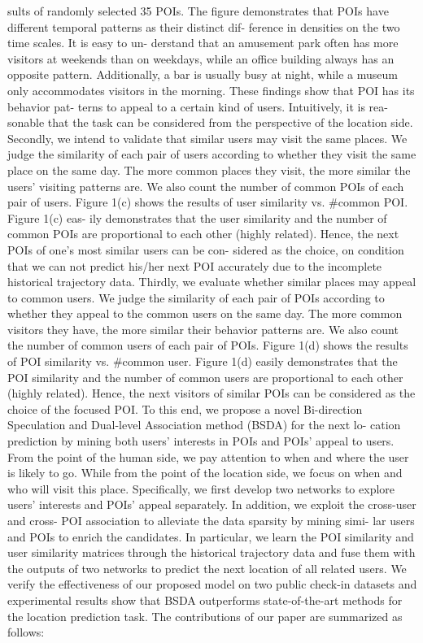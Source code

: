 \documentclass{article}
\begin{document}
sults of randomly selected 35 POIs. The figure demonstrates
that POIs have different temporal patterns as their distinct dif-
ference in densities on the two time scales. It is easy to un-
derstand that an amusement park often has more visitors at
weekends than on weekdays, while an office building always
has an opposite pattern. Additionally, a bar is usually busy
at night, while a museum only accommodates visitors in the
morning. These findings show that POI has its behavior pat-
terns to appeal to a certain kind of users. Intuitively, it is rea-
sonable that the task can be considered from the perspective
of the location side.
Secondly, we intend to validate that similar users may visit
the same places. We judge the similarity of each pair of users
according to whether they visit the same place on the same
day. The more common places they visit, the more similar
the users’ visiting patterns are. We also count the number of
common POIs of each pair of users. Figure 1(c) shows the
results of user similarity vs. \#common POI. Figure 1(c) eas-
ily demonstrates that the user similarity and the number of
common POIs are proportional to each other (highly related).
Hence, the next POIs of one’s most similar users can be con-
sidered as the choice, on condition that we can not predict
his/her next POI accurately due to the incomplete historical
trajectory data.
Thirdly, we evaluate whether similar places may appeal to
common users. We judge the similarity of each pair of POIs
according to whether they appeal to the common users on the
same day. The more common visitors they have, the more
similar their behavior patterns are. We also count the number
of common users of each pair of POIs. Figure 1(d) shows
the results of POI similarity vs. \#common user. Figure 1(d)
easily demonstrates that the POI similarity and the number of
common users are proportional to each other (highly related).
Hence, the next visitors of similar POIs can be considered as
the choice of the focused POI.
To this end, we propose a novel Bi-direction Speculation
and Dual-level Association method (BSDA) for the next lo-
cation prediction by mining both users’ interests in POIs and
POIs’ appeal to users. From the point of the human side,
we pay attention to when and where the user is likely to go.
While from the point of the location side, we focus on when
and who will visit this place. Specifically, we first develop
two networks to explore users’ interests and POIs’ appeal
separately. In addition, we exploit the cross-user and cross-
POI association to alleviate the data sparsity by mining simi-
lar users and POIs to enrich the candidates. In particular, we
learn the POI similarity and user similarity matrices through
the historical trajectory data and fuse them with the outputs of
two networks to predict the next location of all related users.
We verify the effectiveness of our proposed model on two
public check-in datasets and experimental results show that
BSDA outperforms state-of-the-art methods for the location
prediction task.
The contributions of our paper are summarized as follows:
\end{document}
